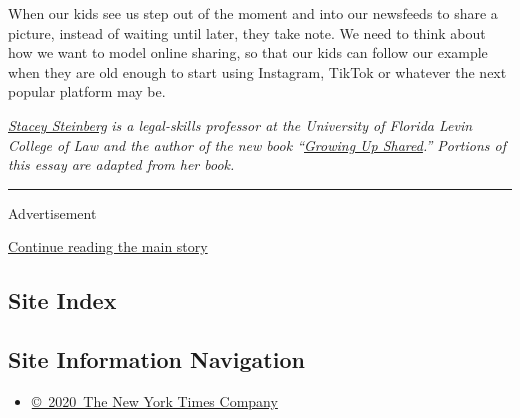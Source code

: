 When our kids see us step out of the moment and into our newsfeeds to
share a picture, instead of waiting until later, they take note. We need
to think about how we want to model online sharing, so that our kids can
follow our example when they are old enough to start using Instagram,
TikTok or whatever the next popular platform may be.

\href{https://www.law.ufl.edu/faculty/stacey-steinberg}{\emph{Stacey
Steinberg}} \emph{is a legal-skills professor at the University of
Florida Levin College of Law and the author of the new book
``}\href{https://www.amazon.com/Growing-Up-Shared-Media-No-Privacy/dp/1492698105}{\emph{Growing
Up Shared}}\emph{.'' Portions of this essay are adapted from her book.}

\begin{center}\rule{0.5\linewidth}{\linethickness}\end{center}

Advertisement

\protect\hyperlink{after-bottom}{Continue reading the main story}

\hypertarget{site-index}{%
\subsection{Site Index}\label{site-index}}

\hypertarget{site-information-navigation}{%
\subsection{Site Information
Navigation}\label{site-information-navigation}}

\begin{itemize}
\tightlist
\item
  \href{https://help.nytimes.com/hc/en-us/articles/115014792127-Copyright-notice}{©~2020~The
  New York Times Company}
\end{itemize}

